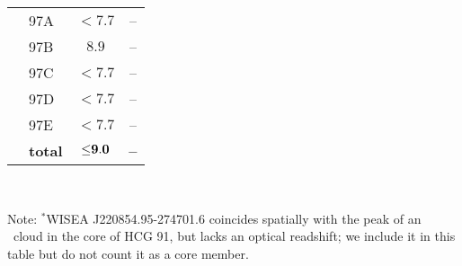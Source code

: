 \begin{table}
\begin{center}
\begin{tabular}{l l c c}
\rule{0pt}{10pt}
 \multirow{6}{*}{97} & 97A & ${<}7.7$ & --\\ 
 & 97B & ${}8.9$ & -- \\ 
 & 97C & ${<}7.7$ & -- \\ 
 & 97D & ${<}7.7$ & -- \\ 
 & 97E & ${<}7.7$ & -- \\ 
 & {\bf total} & ${\bf {\leq}9.0}$ & {\bf --}\\ 
\hline
\end{tabular} \\ 
\rule{0pt}{10pt}
Note: $^*$WISEA J220854.95-274701.6 coincides spatially with the peak of an \hi\ cloud in the core of HCG 91, but lacks an optical readshift; we include it in this table but do not count it as a core member.
\end{center} 
\end{table}